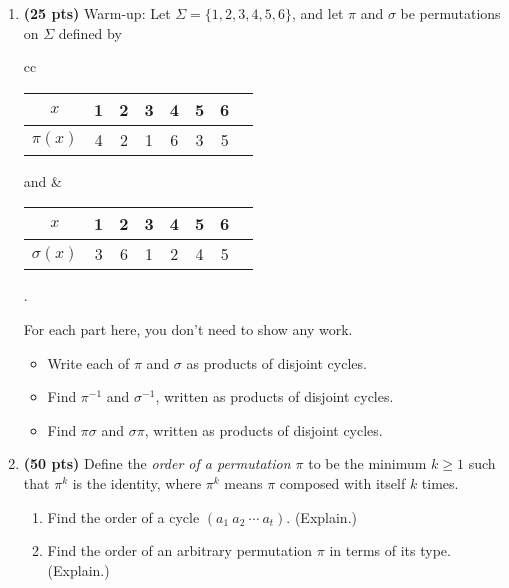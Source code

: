 \documentclass[11pt]{article}
\newcommand{\points}[1]{\textbf{({#1} pts)}}
\begin{document}
\begin{enumerate}

    \item \points{25} Warm-up: Let $\Sigma = \{1,2,3,4,5,6\}$, and let
        $\pi$ and $\sigma$ be permutations on $\Sigma$ defined by

        \begin{center}
        \begin{tabular}{cc}
            \begin{minipage}{2in}
                \begin{tabular}{c|*{7}c}
                    $x$      & 1 & 2 & 3 & 4 & 5 & 6 \\ \hline
                    $\pi(x)$ & 4 & 2 & 1 & 6 & 3 & 5
                \end{tabular}
            \end{minipage}
            and
            &
            \begin{minipage}{2in}
                \begin{tabular}{c|*{7}c}
                    $x$         & 1 & 2 & 3 & 4 & 5 & 6 \\ \hline
                    $\sigma(x)$ & 3 & 6 & 1 & 2 & 4 & 5
                \end{tabular}.
            \end{minipage}
        \end{tabular}
        \end{center}
        For each part here, you don't need to show any work.
        \begin{itemize}
            \item Write each of $\pi$ and $\sigma$ as products of disjoint
                cycles.

            \item Find $\pi^{-1}$ and $\sigma^{-1}$, written as products
                of disjoint cycles.

            \item Find $\pi\sigma$ and $\sigma\pi$, written as products
                of disjoint cycles.
        \end{itemize}

    \item \points{50} Define the \emph{order of a permutation $\pi$} to be the
        minimum
        $k\geq 1$ such that $\pi^k$ is the identity, where $\pi^k$ means
        $\pi$ composed with itself $k$ times.
        \begin{enumerate}
            \item Find the order of a cycle $(a_1\ a_2\ \cdots\ a_t)$.
            (Explain.)
            \item Find the order of an arbitrary permutation $\pi$ 
                in terms of its type. (Explain.)
        \end{enumerate}


\end{enumerate}
\end{document}
